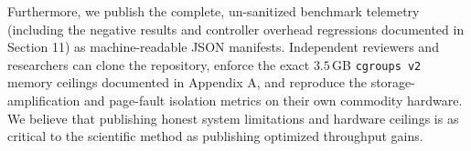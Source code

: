 Furthermore, we publish the complete, un-sanitized benchmark telemetry (including the negative results and controller overhead regressions documented in Section 11) as machine-readable JSON manifests. Independent reviewers and researchers can clone the repository, enforce the exact $3.5$\,GB \texttt{cgroups v2} memory ceilings documented in Appendix A, and reproduce the storage-amplification and page-fault isolation metrics on their own commodity hardware. We believe that publishing honest system limitations and hardware ceilings is as critical to the scientific method as publishing optimized throughput gains.
